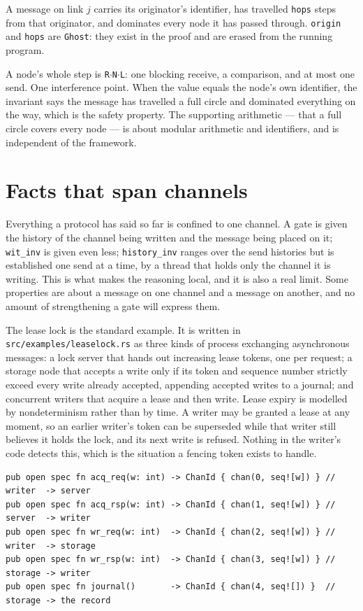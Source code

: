 \documentclass[11pt]{article}
\newcommand{\code}[1]{\texttt{#1}}
\newcommand{\srcname}[1]{%
  \vspace{0.9em}\noindent{\sffamily\scriptsize\color{comment}\MakeUppercase{#1}}\par
  \vspace{-0.7em}}
\begin{document}
A message on link $j$ carries its originator's identifier, has travelled
\code{hops} steps from that originator, and dominates every node it has passed
through. \code{origin} and \code{hops} are \code{Ghost}: they exist in the proof
and are erased from the running program.

A node's whole step is \code{R}$\cdot$\code{N}$\cdot$\code{L}: one blocking
receive, a comparison, and at most one send. One interference point. When the
value equals the node's own identifier, the invariant says the message has
travelled a full circle and dominated everything on the way, which is the safety
property. The supporting arithmetic --- that a full circle covers every node ---
is about modular arithmetic and identifiers, and is independent of the framework.

\section{Facts that span channels}\label{sec:provenance}

Everything a protocol has said so far is confined to one channel. A gate is
given the history of the channel being written and the message being placed on
it; \code{wit\_inv} is given even less; \code{history\_inv} ranges over the send
histories but is established one send at a time, by a thread that holds only the
channel it is writing. This is what makes the reasoning local, and it is also a
real limit. Some properties are about a message on one channel and a message on
another, and no amount of strengthening a gate will express them.

The lease lock is the standard example. It is written in
\code{src/examples/leaselock.rs} as three kinds of process exchanging
asynchronous messages: a lock server that hands out increasing lease tokens, one
per request; a storage node that accepts a write only if its token and sequence
number strictly exceed every write already accepted, appending accepted writes
to a journal; and concurrent writers that acquire a lease and then write. Lease
expiry is modelled by nondeterminism rather than by time. A writer may be
granted a lease at any moment, so an earlier writer's token can be superseded
while that writer still believes it holds the lock, and its next write is
refused. Nothing in the writer's code detects this, which is the situation a
fencing token exists to handle.

\srcname{src/examples/leaselock.rs --- channels}
\begin{lstlisting}
pub open spec fn acq_req(w: int) -> ChanId { chan(0, seq![w]) } // writer  -> server
pub open spec fn acq_rsp(w: int) -> ChanId { chan(1, seq![w]) } // server  -> writer
pub open spec fn wr_req(w: int)  -> ChanId { chan(2, seq![w]) } // writer  -> storage
pub open spec fn wr_rsp(w: int)  -> ChanId { chan(3, seq![w]) } // storage -> writer
pub open spec fn journal()       -> ChanId { chan(4, seq![]) }  // storage -> the record
\end{lstlisting}
\end{document}
